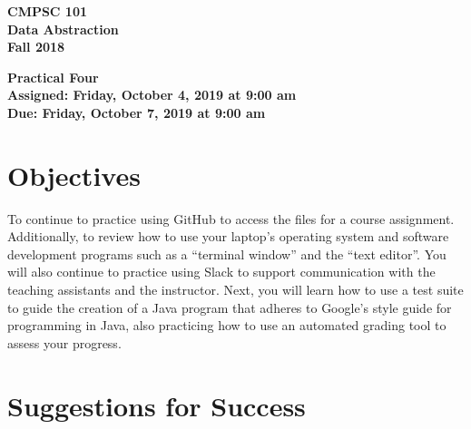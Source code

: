 \documentclass[11pt]{article}
\newcommand{\assignmentduedate}{October 7}
\newcommand{\assignmentassignedate}{October 4}
\newcommand{\assignmentnumber}{Four}
\newcommand{\labyear}{2019}
\newcommand{\labdueday}{Friday}
\newcommand{\labassignday}{Friday}
\newcommand{\labtime}{9:00 am}
\newcommand{\assigneddate}{Assigned: \labassignday, \assignmentassignedate, \labyear{} at \labtime{}}
\newcommand{\duedate}{Due: \labdueday, \assignmentduedate, \labyear{} at \labtime{}}
\newcommand{\labtitle}[1]
{
  \begin{center}
    \begin{center}
      \bf
      CMPSC 101\\Data Abstraction\\
      Fall 2018\\
      \medskip
    \end{center}
    \bf
    #1
  \end{center}
}
\begin{document}
\thispagestyle{empty}

\labtitle{Practical \assignmentnumber{} \\ \assigneddate{} \\ \duedate{}}

\section*{Objectives}

To continue to practice using GitHub to access the files for a course
assignment. Additionally, to review how to use your laptop's operating system
and software development programs such as a ``terminal window'' and the ``text
editor''. You will also continue to practice using Slack to support
communication with the teaching assistants and the instructor. Next, you will
learn how to use a test suite to guide the creation of a Java program that
adheres to Google's style guide for programming in Java, also practicing how to
use an automated grading tool to assess your progress.

\section*{Suggestions for Success}
\end{document}

